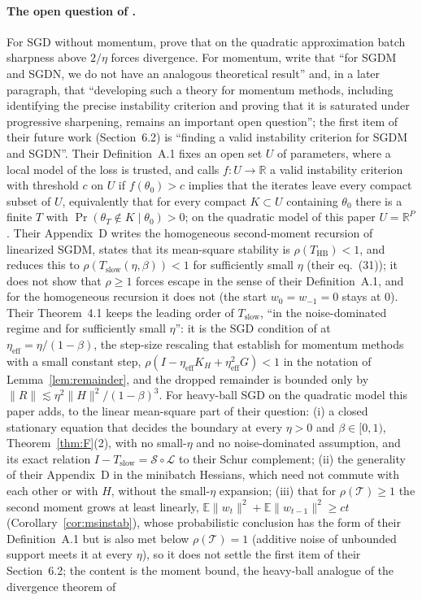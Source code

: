 \documentclass[11pt]{article}
\theoremstyle{remark}
\newcommand{\E}{\mathbb{E}}
\newcommand{\R}{\mathbb{R}}
\begin{document}
\paragraph{The open question of \citet{andreyev2026momentum}.} For SGD without momentum, \citet{andreyev2024eoss} prove that on the quadratic approximation batch sharpness above $2/\eta$ forces divergence. For momentum, \citet[Section~3]{andreyev2026momentum} write that ``for SGDM and SGDN, we do not have an analogous theoretical result'' and, in a later paragraph, that ``developing such a theory for momentum methods, including identifying the precise instability criterion and proving that it is saturated under progressive sharpening, remains an important open question''; the first item of their future work (Section~6.2) is ``finding a valid instability criterion for SGDM and SGDN''. Their Definition~A.1 fixes an open set $U$ of parameters, where a local model of the loss is trusted, and calls $f:U\to\R$ a valid instability criterion with threshold $c$ on $U$ if $f(\theta_0)>c$ implies that the iterates leave every compact subset of $U$, equivalently that for every compact $K\subset U$ containing $\theta_0$ there is a finite $T$ with $\Pr(\theta_T\notin K\mid\theta_0)>0$; on the quadratic model of this paper $U=\R^P$. Their Appendix~D writes the homogeneous second-moment recursion of linearized SGDM, states that its mean-square stability is $\rho(T_{\mathrm{HB}})<1$, and reduces this to $\rho(T_{\mathrm{slow}}(\eta,\beta))<1$ for sufficiently small $\eta$ (their eq.~(31)); it does not show that $\rho\ge1$ forces escape in the sense of their Definition~A.1, and for the homogeneous recursion it does not (the start $w_0=w_{-1}=0$ stays at $0$). Their Theorem~4.1 keeps the leading order of $T_{\mathrm{slow}}$, ``in the noise-dominated regime and for sufficiently small $\eta$'': it is the SGD condition of \citet{ma2021linear} at $\eta_{\mathrm{eff}}=\eta/(1-\beta)$, the step-size rescaling that \citet{yuan2016momentum} establish for momentum methods with a small constant step, $\rho(I-\eta_{\mathrm{eff}}K_H+\eta_{\mathrm{eff}}^2G)<1$ in the notation of Lemma~\ref{lem:remainder}, and the dropped remainder is bounded only by $\|R\|\lesssim\eta^2\|H\|^2/(1-\beta)^3$. For heavy-ball SGD on the quadratic model this paper adds, to the linear mean-square part of their question: (i) a closed stationary equation that decides the boundary at every $\eta>0$ and $\beta\in[0,1)$, Theorem~\ref{thm:F}(2), with no small-$\eta$ and no noise-dominated assumption, and its exact relation $I-T_{\mathrm{slow}}=\mathcal S\circ\mathcal L$ to their Schur complement; (ii) the generality of their Appendix~D in the minibatch Hessians, which need not commute with each other or with $H$, without the small-$\eta$ expansion; (iii) that for $\rho(\mathcal T)\ge1$ the second moment grows at least linearly, $\E\|w_t\|^2+\E\|w_{t-1}\|^2\ge ct$ (Corollary~\ref{cor:msinstab}), whose probabilistic conclusion has the form of their Definition~A.1 but is also met below $\rho(\mathcal T)=1$ (additive noise of unbounded support meets it at every $\eta$), so it does not settle the first item of their Section~6.2; the content is the moment bound, the heavy-ball analogue of the divergence theorem of 
\end{document}

